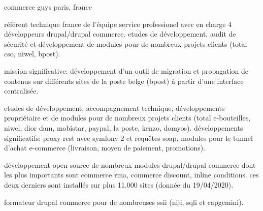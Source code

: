 \cventry
{} %
{commerce guys} %
{paris, france} %
{} %
{
\begin{cvsubentries}
    \begin{cvitems} %
        \item
        {
        référent technique france de l'équipe service professionel avec en charge 4
        développeurs drupal/drupal commerce. etudes de développement, audit de sécurité et
        développement de modules pour de nombreux projets clients (total cso, niwel, bpost).
        }
        \item
        {
        mission significative: développement d'un outil de migration et propagation de contenus
        sur différents sites de la poste belge (bpost) à partir d'une interface centralisée.
        }
    \end{cvitems}
    \begin{cvitems} %
        \item
        {
        etudes de développement, accompagnement technique, développements propriétaire et de modules
        pour de nombreux projets clients (total e-bouteilles, niwel, dior dam, mobistar, paypal, 
        la poste, kenzo, domyos). développements significatifs: proxy rest avec symfony 2 et 
        requêtes soap, modules pour le tunnel d'achat e-commerce (livraison, moyen de paiement, promotions).
        }
        \item
        {
        développement open source de nombreux modules drupal/drupal commerce dont les plus importants sont
        commerce rma, commerce discount, inline conditions. ces deux derniers sont installés sur plus 11.000
        sites (donnée du 19/04/2020).
        }
        \item
        {
        formateur drupal commerce pour de nombreuses ssii (niji, sqli et capgemini).
        }
    \end{cvitems}
\end{cvsubentries}
}